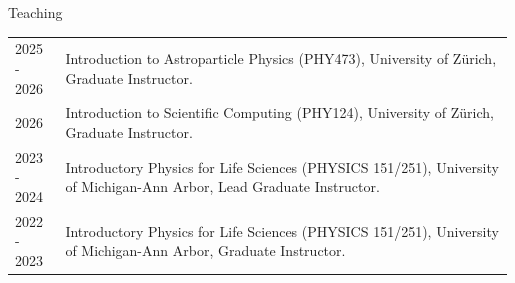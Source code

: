 \begin{rSection}{Teaching}
\setlength{\extrarowheight}{3pt}
\begin{longtable}{p{0.1\linewidth}p{0.89\linewidth}}
2025 - 2026 & Introduction to Astroparticle Physics (PHY473), University of Zürich, Graduate Instructor. \\
2026 & Introduction to Scientific Computing (PHY124), University of Zürich, Graduate Instructor. \\
2023 - 2024 & Introductory Physics for Life Sciences (PHYSICS 151/251), University of Michigan-Ann Arbor, Lead Graduate Instructor. \\
2022 - 2023 & Introductory Physics for Life Sciences (PHYSICS 151/251), University of Michigan-Ann Arbor, Graduate Instructor. \\
\end{longtable}
\end{rSection}
